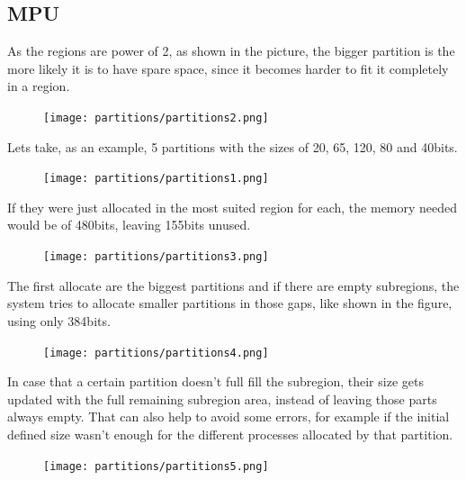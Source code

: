 \subsection{MPU}
As the regions are power of 2, as shown in the picture, the bigger partition is the more likely it 
is to have spare space, since it becomes harder to fit it completely in a region.\\
\begin{figure}[H]
\centering
\texttt{[image: partitions/partitions2.png]}
\label{fig:simple_system}
\end{figure}
Lets take, as an example, 5 partitions with the sizes of 20, 65, 120, 80 and 40bits.\\
\begin{figure}[H]
\centering
\texttt{[image: partitions/partitions1.png]}
\label{fig:simple_system}
\end{figure}
If they were just allocated in the most suited region for each, the memory needed would be of 480bits, 
leaving 155bits unused.\\
\begin{figure}[H]
\centering
\texttt{[image: partitions/partitions3.png]}
\label{fig:simple_system}
\end{figure}
The first allocate are the biggest partitions and if there are empty subregions, the system tries to 
allocate smaller partitions in those gaps, like shown in the figure, using only 384bits.\\
\begin{figure}[H]
\centering
\texttt{[image: partitions/partitions4.png]}
\label{fig:simple_system}
\end{figure}
In case that a certain partition doesn't full fill the subregion, their size gets updated with the full 
remaining subregion area, 
instead of leaving those parts always empty. That can also help to avoid some errors, for example if the 
initial defined size wasn't enough for the different processes allocated by that partition.\\
\begin{figure}[H]
\centering
\texttt{[image: partitions/partitions5.png]}
\label{fig:simple_system}
\end{figure}

